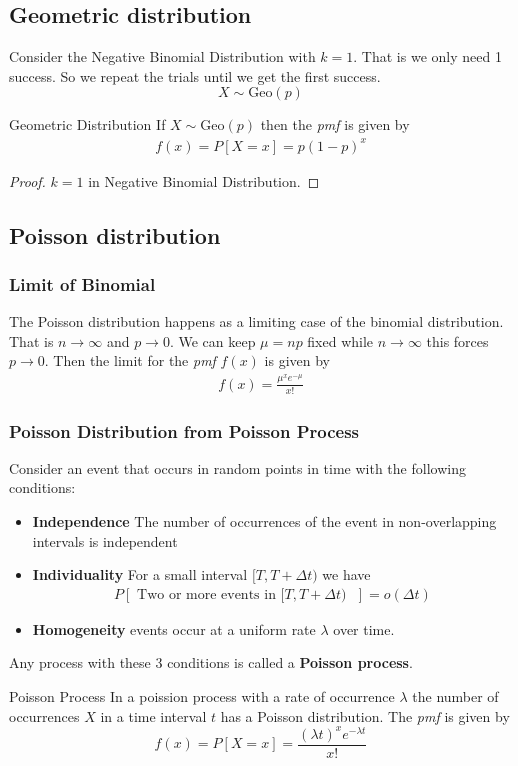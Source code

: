 \documentclass[16pt,a4paper]{article}
\begin{document}
\subsection{Geometric distribution}
Consider the Negative Binomial Distribution with $k=1$. That is we only need 1 success. So we repeat the trials until we get the first success.  
\[
X\sim \text{Geo}(p)
\]
\begin{thm}{Geometric Distribution}
If $X\sim \text{Geo}(p)$ then the \textit{pmf} is given by 
\begin{align*}
f(x) = P[X=x] = p(1-p)^x
\end{align*}
\begin{proof}
$k=1$ in Negative Binomial Distribution. 
\end{proof}
\end{thm}
\newpage
\subsection{Poisson distribution}
\subsubsection{Limit of Binomial}
The Poisson distribution happens as a limiting case of the binomial distribution. That is $n\to \infty$ and $p\to 0$. We can keep $\mu = np$ fixed while $n\to \infty$ this forces $p\to 0$. Then the limit for the \textit{pmf} $f(x)$ is given by 
\begin{align*}
f(x) = \frac{\mu^x e^{-\mu}}{x!}
\end{align*}
\subsubsection{Poisson Distribution from Poisson Process}
Consider an event that occurs in random points in time with the following conditions: 
\begin{itemize}
\item \textbf{Independence} The number of occurrences of the event in non-overlapping intervals is independent
\item \textbf{Individuality} For a small interval $[T, T+\Delta t)$ we have 
\begin{align*}
P[\text{ Two or more events in $[T, T+\Delta t)$ } ] = o(\Delta t)
\end{align*}
\item \textbf{Homogeneity} events occur at a uniform rate $\lambda$ over time. 
\end{itemize}
Any process with these 3 conditions is called a \textbf{Poisson process}. 
\begin{thm}{Poisson Process}
In a poission process with a rate of occurrence $\lambda$ the number of occurrences $X$ in a time interval $t$ has a Poisson distribution. The \textit{pmf} is given by 
\[
f(x) = P[X=x] = \frac{(\lambda t)^x e^{-\lambda t}}{x!}
\]
\end{thm}
\newpage
\end{document}
